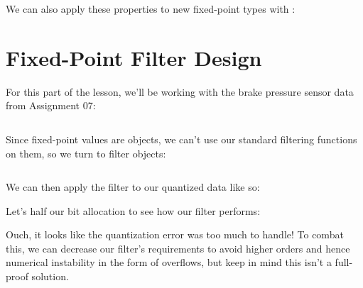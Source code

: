 \documentclass{article}
\begin{document}


We can also apply these properties to new fixed-point types with
:


\section{Fixed-Point Filter Design}

For this part of the lesson, we'll be working with the brake pressure
sensor data from Assignment
07:

\inputminted{matlab}{09-fixed-point-arithmetic.d/load-data.m}

Since fixed-point values are objects, we can't use our standard
filtering functions on them, so we turn to filter objects:


\inputminted{matlab}{09-fixed-point-arithmetic.d/lpf.m}

We can then apply the filter to our quantized data like so:


Let's half our bit allocation to see how our filter performs:


Ouch, it looks like the quantization error was too much to handle!  To
combat this, we can decrease our filter's requirements to avoid higher
orders and hence numerical instability in the form of overflows, but
keep in mind this isn't a full-proof solution.
\end{document}
